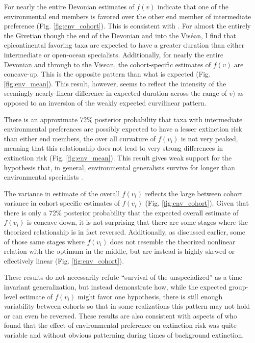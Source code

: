 \documentclass[12pt,letterpaper]{article}
\begin{document}
For nearly the entire Devonian estimates of \(f(v)\) indicate that one of the environmental end members is favored over the other end member of intermediate preference (Fig. \ref{fig:env_cohort}). This is consistent with \citet{Miller2009a}. For almost the entirely the Givetian though the end of the Devonian and into the Vis\'{e}an, I find that epicontinental favoring taxa are expected to have a greater duration than either intermediate or open-ocean specialists. Additionally, for nearly the entire Devonian and through to the Visean, the cohort-specific estimates of \(f(v)\) are concave-up. This is the opposite pattern than what is expected (Fig. \ref{fig:env_mean}). This result, however, seems to reflect the intensity of the seemingly nearly-linear difference in expected duration across the range of \(v)\) as opposed to an inversion of the weakly expected curvilinear pattern.

There is an approximate 72\% posterior probability that taxa with intermediate environmental preferences are possibly expected to have a lesser extinction risk than either end members, the over all curvature of \(f(v_{i})\) is not very peaked, meaning that this relationship does not lead to very strong differences in extinction risk (Fig. \ref{fig:env_mean}). This result gives weak support for the hypothesis that, in general, environmental generalists survive for longer than environmental specialists \citep{Simpson1944,Liow2004a,Liow2007b,Nurnberg2013a,Nurnberg2015}.

The variance in estimate of the overall \(f(v_{i})\) reflects the large between cohort variance in cohort specific estimates of \(f(v_{i})\) (Fig. \ref{fig:env_cohort}). Given that there is only a 72\% posterior probability that the expected overall estimate of \(f(v_{i})\) is concave down, it is not surprising that there are some stages where the theorized relationship is in fact reversed. Additionally, as discussed earlier, some of those same stages where \(f(v_{i})\) does not resemble the theorized nonlinear relation with the optimum in the middle, but are instead is highly skewed or effectively linear (Fig. \ref{fig:env_cohort}). 

These results do not necessarily refute ``survival of the unspecialized'' as a time-invariant generalization, but instead demonstrate how, while the expected group-level estimate of \(f(v_{i})\) might favor one hypothesis, there is still enough variability between cohorts so that in some realizations this pattern may not hold or can even be reversed. These results are also consistent with aspects of \citet{Miller2009a} who found that the effect of environmental preference on extinction risk was quite variable and without obvious patterning during times of background extinction.
\end{document}
